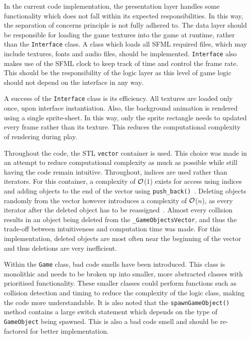 \documentclass[10pt,twocolumn]{witseiepaper}
\begin{document}
In the current code implementation, the presentation layer handles some functionality which does not fall within its expected responsibilities. In this way, the separation of concerns principle is not fully adhered to. The data layer should be responsible for loading the game textures into the game at runtime, rather than the \texttt{Interface} class. A class which loads all SFML required files, which may include textures, fonts and audio files, should be implemented. \texttt{Interface} also makes use of the SFML clock to keep track of time and control the frame rate. This should be the responsibility of the logic layer as this level of game logic should not depend on the interface in any way.

A success of the \texttt{Interface} class is its efficiency. All textures are loaded only once, upon interface instantiation. Also, the background animation is rendered using a single sprite-sheet. In this way, only the sprite rectangle needs to updated every frame rather than its texture. This reduces the computational complexity of rendering during play.

Throughout the code, the STL \texttt{vector} container is used. This choice was made in an attempt to reduce computational complexity as much as possible while still having the code remain intuitive. Throughout, indices are used rather than iterators. For this container, a complexity of $\cal{O}$($1$) exists for access using indices and adding objects to the end of the vector using \texttt{push\_back()}~\cite{vector_complexity}. Deleting objects randomly from the vector however introduces a complexity of  $\cal{O}$($n$), as every iterator after the deleted object has to be reassigned~\cite{vector_complexity}. Almost every collision results in an object being deleted from the \texttt{\_GameObjectsVector}, and thus the trade-off between intuitiveness and computation time was made. For this implementation, deleted objects are most often near the beginning of the vector and thus deletions are very inefficient. 


Within the \texttt{Game} class, bad code smells have been introduced. This class is monolithic and needs to be broken up into smaller, more abstracted classes with prioritised functionality. These smaller classes could perform functions such as collision detection and timing to reduce the complexity of the logic class, making the code more understandable. It is also noted that the \texttt{spawnGameObject()} method contains a large switch statement which depends on the type of \texttt{GameObject} being spawned. This is also a bad code smell and should be re-factored for better implementation.
\end{document}
